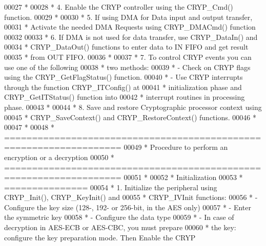 \begin{DoxyCode}
00027 \textcolor{comment}{  *}
00028 \textcolor{comment}{  *          4. Enable the CRYP controller using the CRYP\_Cmd() function. }
00029 \textcolor{comment}{  *}
00030 \textcolor{comment}{  *          5. If using DMA for Data input and output transfer, }
00031 \textcolor{comment}{  *             Activate the needed DMA Requests using CRYP\_DMACmd() function }
00032 \textcolor{comment}{  }
00033 \textcolor{comment}{  *          6. If DMA is not used for data transfer, use CRYP\_DataIn() and }
00034 \textcolor{comment}{  *             CRYP\_DataOut() functions to enter data to IN FIFO and get result}
00035 \textcolor{comment}{  *             from OUT FIFO.}
00036 \textcolor{comment}{  *}
00037 \textcolor{comment}{  *          7. To control CRYP events you can use one of the following }
00038 \textcolor{comment}{  *              two methods:}
00039 \textcolor{comment}{  *               - Check on CRYP flags using the CRYP\_GetFlagStatus() function.  }
00040 \textcolor{comment}{  *               - Use CRYP interrupts through the function CRYP\_ITConfig() at }
00041 \textcolor{comment}{  *                 initialization phase and CRYP\_GetITStatus() function into }
00042 \textcolor{comment}{  *                 interrupt routines in processing phase.}
00043 \textcolor{comment}{  *       }
00044 \textcolor{comment}{  *          8. Save and restore Cryptographic processor context using  }
00045 \textcolor{comment}{  *             CRYP\_SaveContext() and CRYP\_RestoreContext() functions.     }
00046 \textcolor{comment}{  *}
00047 \textcolor{comment}{  *}
00048 \textcolor{comment}{  *          ===================================================================  }
00049 \textcolor{comment}{  *                Procedure to perform an encryption or a decryption}
00050 \textcolor{comment}{  *          ===================================================================  }
00051 \textcolor{comment}{  *}
00052 \textcolor{comment}{  *      Initialization}
00053 \textcolor{comment}{  *      ===============  }
00054 \textcolor{comment}{  *     1. Initialize the peripheral using CRYP\_Init(), CRYP\_KeyInit() and }
00055 \textcolor{comment}{  *        CRYP\_IVInit functions:}
00056 \textcolor{comment}{  *        - Configure the key size (128-, 192- or 256-bit, in the AES only) }
00057 \textcolor{comment}{  *        - Enter the symmetric key }
00058 \textcolor{comment}{  *        - Configure the data type}
00059 \textcolor{comment}{  *        - In case of decryption in AES-ECB or AES-CBC, you must prepare }
00060 \textcolor{comment}{  *          the key: configure the key preparation mode. Then Enable the CRYP }

\end{DoxyCode}
